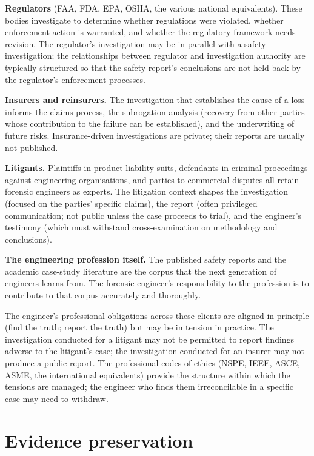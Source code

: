 \textbf{Regulators} (FAA, FDA, EPA, OSHA, the various national equivalents). These bodies investigate to determine whether regulations were violated, whether enforcement action is warranted, and whether the regulatory framework needs revision. The regulator's investigation may be in parallel with a safety investigation; the relationships between regulator and investigation authority are typically structured so that the safety report's conclusions are not held back by the regulator's enforcement processes.

\textbf{Insurers and reinsurers.} The investigation that establishes the cause of a loss informs the claims process, the subrogation analysis (recovery from other parties whose contribution to the failure can be established), and the underwriting of future risks. Insurance-driven investigations are private; their reports are usually not published.

\textbf{Litigants.} Plaintiffs in product-liability suits, defendants in criminal proceedings against engineering organisations, and parties to commercial disputes all retain forensic engineers as experts. The litigation context shapes the investigation (focused on the parties' specific claims), the report (often privileged communication; not public unless the case proceeds to trial), and the engineer's testimony (which must withstand cross-examination on methodology and conclusions).

\textbf{The engineering profession itself.} The published safety reports and the academic case-study literature are the corpus that the next generation of engineers learns from. The forensic engineer's responsibility to the profession is to contribute to that corpus accurately and thoroughly.

The engineer's professional obligations across these clients are aligned in principle (find the truth; report the truth) but may be in tension in practice. The investigation conducted for a litigant may not be permitted to report findings adverse to the litigant's case; the investigation conducted for an insurer may not produce a public report. The professional codes of ethics (NSPE, IEEE, ASCE, ASME, the international equivalents) provide the structure within which the tensions are managed; the engineer who finds them irreconcilable in a specific case may need to withdraw.

\section{Evidence preservation}


